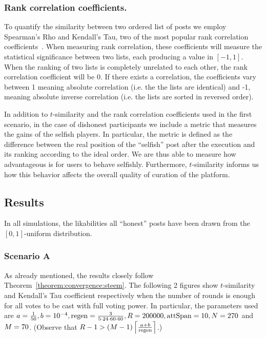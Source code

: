     \subsubsection*{Rank correlation coefficients.}
      To quantify the similarity between two ordered list of posts we employ
      Spearman's Rho and Kendall's Tau, two of the most popular rank correlation
      coefficients~\cite{kendall1955rank}. When measuring rank correlation,
      these coefficients will measure the statistical significance between two
      lists, each producing a value in $\left[-1, 1\right]$. When the ranking of
      two lists is completely unrelated to each other, the rank correlation
      coefficient will be 0. If there exists a correlation, the coefficients
      vary between 1 meaning absolute correlation (i.e. the the lists are
      identical) and -1, meaning absolute inverse correlation (i.e. the lists
      are sorted in reversed order).

    In addition to $t$-similarity and the rank correlation coefficients used in
    the first scenario, in the case of dishonest participants we include a
    metric that measures the gains of the selfish players. In particular, the
    metric is defined as the difference between the real position of the
    ``selfish'' post after the execution and its ranking according to the ideal
    order. We are thus able to measure how advantageous is for users to behave
    selfishly.  Furthermore, $t$-similarity informs us how this behavior
    affects the overall quality of curation of the platform.

  \subsection{Results}
    In all simulations, the likabilities all ``honest'' posts have been drawn
    from the $\left[0, 1\right]$-uniform distribution.

    \subsubsection*{Scenario A}
      As already mentioned, the results closely follow
      Theorem~\ref{theorem:convergence:steem}. The following 2 figures show
      $t$-similarity and Kendall's Tau coefficient respectively when the number
      of rounds is enough for all votes to be cast with full voting power. In
      particular, the parameters used are $a = \frac{1}{50}, b = 10^{-4}, \regen
      = \frac{3}{5 \cdot 24 \cdot 60 \cdot 60}, \rounds = 200000, \attspan = 10,
      \playerlen = 270$ and $\postlen = 70$. (Observe that $\rounds - 1 >
      \left(\postlen - 1\right)\ceil*{\frac{a + b}{\regen}}$.)

